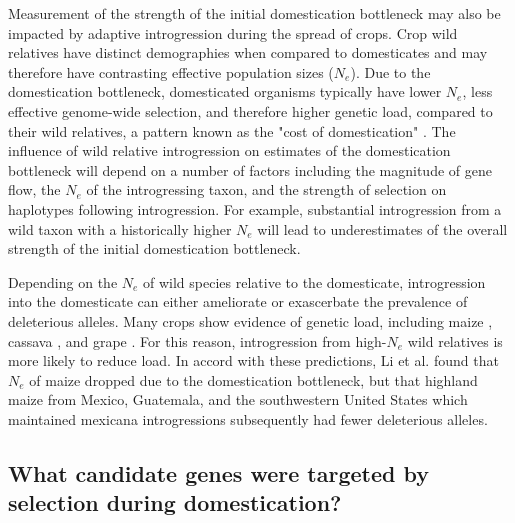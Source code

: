 \documentclass[11pt]{article}
\begin{document}
{Measurement of the strength of the initial domestication bottleneck may also be impacted by adaptive introgression during the spread of crops.
Crop wild relatives have distinct demographies when compared to domesticates and may therefore have contrasting effective population sizes ($N_e$).
Due to the domestication bottleneck, domesticated organisms typically have lower $N_e$, less effective genome-wide selection, and therefore higher genetic load, compared to their wild relatives, a pattern known as the "cost of domestication" \cite{moyers2017genetic}.
The influence of wild relative introgression on estimates of the domestication bottleneck will depend on a number of factors including the magnitude of gene flow, the $N_e$ of the introgressing taxon, and the strength of selection on haplotypes following introgression.
For example, substantial introgression from a wild taxon with a historically higher $N_e$ will lead to underestimates of the overall strength of the initial domestication bottleneck.

Depending on the $N_e$ of wild species relative to the domesticate, introgression into the domesticate can either ameliorate or exascerbate the prevalence of deleterious alleles.
Many crops show evidence of genetic load, including maize \cite{wang2017interplay}, cassava \cite{ramu2017cassava}, and grape \cite{zhou2017evolutionary}.
For this reason, introgression from high-$N_e$ wild relatives is more likely to reduce load.
In accord with these predictions, Li et al. \cite{wang2017interplay} found that $N_e$ of maize dropped due to the domestication bottleneck, but that highland maize from Mexico, Guatemala, and the southwestern United States which maintained mexicana introgressions subsequently had fewer deleterious alleles.

\subsection*{What candidate genes were targeted by selection during domestication?}

}
\end{document}
